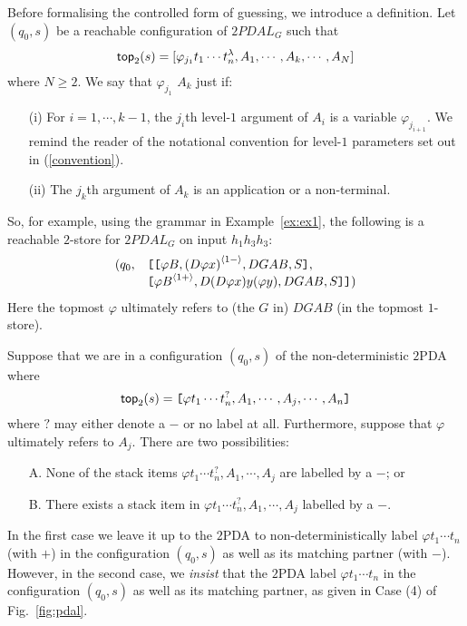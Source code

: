 Before formalising the controlled form of guessing, we introduce a
definition. Let $(q_0, s)$ be a reachable configuration of $2PDAL_G$
such that
\begin{equation}
\nonumber {\sf top}_2(s) = [\varphi_{j_1} t_1 \cdots t_n^\lambda, A_1,
\cdots, A_k, \cdots, A_N]
\end{equation}
where $N \geq 2$. We say that $\varphi_{j_1}$  $A_k$ just if:
\begin{itemize}
\item[(i)] For $i = 1, \cdots, k-1$, the $j_i$th level-$1$ argument of
$A_i$ is a variable $\varphi_{j_{i+1}}$. We remind the reader of the
notational convention for level-$1$ parameters set out in (\ref{convention}).
\item[(ii)] The $j_{k}$th argument of $A_k$ is an application or a
non-terminal.
\end{itemize}
So, for example, using the grammar in Example~\ref{ex:ex1}, the
following is a reachable $2$-store for $2PDAL_G$ on input $h_1h_3h_3$:
\begin{equation}
\nonumber \begin{array}{rl}
(q_0, & \hbox{\tt [}\hbox{\tt [}{\varphi B,{(D \varphi x)}^{\langle{1-}\rangle},
DGAB, S}\hbox{\tt ]},\\
& \hbox{\tt [}{{\varphi B}^{\langle{1+}\rangle}, D (D \varphi x) y (\varphi y),
DGAB,S}\hbox{\tt ]}\hbox{\tt ]})
\end{array}
\end{equation}
Here the topmost $\varphi$ ultimately refers to (the $G$ in) $DGAB$ (in
the topmost $1$-store).

Suppose that we are in a configuration $(q_0, s)$ of the
non-deterministic $2$PDA where
\begin{equation}
\nonumber {\sf top}_2(s) = \hbox{\tt [}{\varphi t_1 \cdots t_n^{?}, A_1,
\cdots, A_j, \cdots, A_n}\hbox{\tt ]}
\end{equation}
where $?$ may either denote a $-$ or no label at all. Furthermore,
suppose that $\varphi$ ultimately refers to $A_j$. There are two possibilities:
\begin{enumerate}
\item[A.] None of the stack items $\varphi t_1 \cdots t_n^{?}, A_1,
\cdots, A_j$ are labelled by a $-$; or \item[B.] There exists a stack item
in  $\varphi t_1 \cdots t_n^{?}, A_1, \cdots, A_j$ labelled by a
$-$.
\end{enumerate}
In the first case we leave it up to the $2$PDA to
non-deterministically label $\varphi t_1 \cdots t_n$ (with $+$) in the
configuration $(q_0, s)$ as well as its matching partner (with $-$). However,
in the second case, we \emph{insist} that the $2$PDA label
$\varphi t_1 \cdots t_n$ in the configuration $(q_0, s)$ as well
as its matching partner, as given in Case (4) of Fig.~\ref{fig:pdal}.

